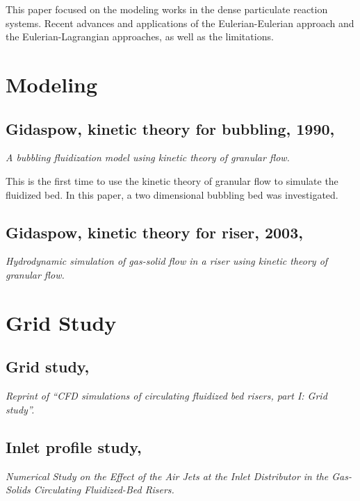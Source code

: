 \documentclass[12pt]{report}
\begin{document}
This paper focused on the modeling works in the dense particulate reaction systems. Recent advances and applications of the Eulerian-Eulerian approach and the Eulerian-Lagrangian approaches, as well as the limitations.

\section{Modeling}
%
%
\subsection{Gidaspow, kinetic theory for bubbling, 1990, \cite{Ding1990}}
\textit{A bubbling fluidization model using kinetic theory of granular flow.}

This is the first time to use the kinetic theory of granular flow to simulate the fluidized bed. In this paper, a two dimensional bubbling bed was investigated. 

%
%
\subsection{Gidaspow, kinetic theory for riser, 2003, \cite{Huilin2003}}
\textit{Hydrodynamic simulation of gas-solid flow in a riser using kinetic theory of granular flow.}

\section{Grid Study}
%
%
\subsection{Grid study, \cite{Li2014}}
\textit{Reprint of ``CFD simulations of circulating fluidized bed risers, part I: Grid study''.}

%
%
\subsection{Inlet profile study, \cite{Peng2010}}
\textit{Numerical Study on the Effect of the Air Jets at the Inlet Distributor in the Gas-Solids Circulating Fluidized-Bed Risers.}

%
%
\end{document}
